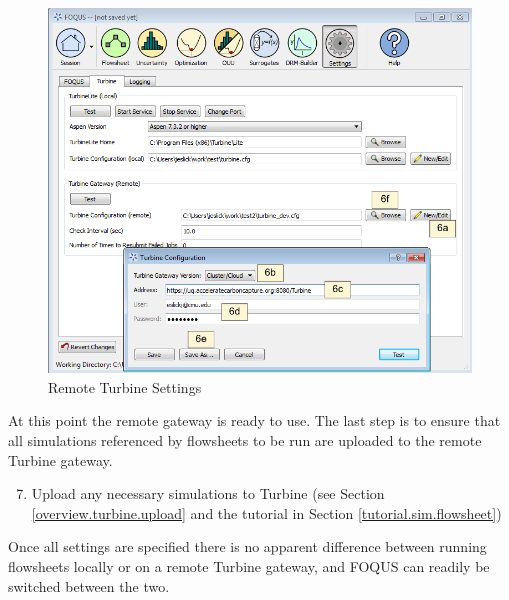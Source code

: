 \begin{figure}[H]
	\begin{center}
		\includegraphics[scale=0.55]{Chapt_flowsheet/figs/remoteSetting}
		\caption{Remote Turbine Settings}
		\label{fig.remote.settings}
	\end{center}
\end{figure}

At this point the remote gateway is ready to use.  The last step is to ensure that all simulations referenced by flowsheets to be run are uploaded to the remote Turbine gateway.

\begin{enumerate}
	\setcounter{enumi}{6}
	\item Upload any necessary simulations to Turbine (see Section \ref{overview.turbine.upload} and the tutorial in Section \ref{tutorial.sim.flowsheet})
\end{enumerate}

Once all settings are specified there is no apparent difference between running flowsheets locally or on a remote Turbine gateway, and FOQUS can readily be switched between the two.
